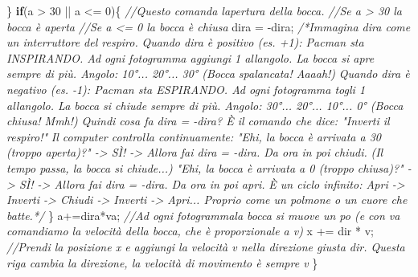 \documentclass[
]{article}
\newenvironment{Shaded}{}{}
\newcommand{\CommentTok}[1]{\textcolor[rgb]{0.38,0.63,0.69}{\textit{#1}}}
\newcommand{\ControlFlowTok}[1]{\textcolor[rgb]{0.00,0.44,0.13}{\textbf{#1}}}
\newcommand{\DecValTok}[1]{\textcolor[rgb]{0.25,0.63,0.44}{#1}}
\newcommand{\NormalTok}[1]{#1}
\newcommand{\OperatorTok}[1]{\textcolor[rgb]{0.40,0.40,0.40}{#1}}
\begin{document}
\begin{Shaded}
\begin{Highlighting}[]
    \OperatorTok{\}}
    \ControlFlowTok{if}\OperatorTok{(}\NormalTok{a }\OperatorTok{\textgreater{}} \DecValTok{30} \OperatorTok{||}\NormalTok{ a }\OperatorTok{\textless{}=} \DecValTok{0}\OperatorTok{)\{} \CommentTok{//Questo comanda l\textquotesingle{}apertura della bocca.}
    \CommentTok{//Se a \textgreater{} 30 la bocca è aperta}
    \CommentTok{//Se a \textless{}= 0 la bocca è chiusa}
\NormalTok{        dira }\OperatorTok{=} \OperatorTok{{-}}\NormalTok{dira}\OperatorTok{;}
        \CommentTok{/*Immagina dira come un interruttore del respiro.}
\CommentTok{        Quando dira è positivo (es. +1): Pacman sta INSPIRANDO. Ad ogni fotogramma aggiungi 1 all\textquotesingle{}angolo. La bocca si apre sempre di più. Angolo: 10°... 20°... 30° (Bocca spalancata! Aaaah!)}
\CommentTok{        Quando dira è negativo (es. {-}1): Pacman sta ESPIRANDO. Ad ogni fotogramma togli 1 all\textquotesingle{}angolo. La bocca si chiude sempre di più. Angolo: 30°... 20°... 10°... 0° (Bocca chiusa! Mmh!)}
\CommentTok{        Quindi cosa fa dira = {-}dira? È il comando che dice: "Inverti il respiro!"}
\CommentTok{        Il computer controlla continuamente:}
\CommentTok{        "Ehi, la bocca è arrivata a 30 (troppo aperta)?" {-}\textgreater{} SÌ! {-}\textgreater{} Allora fai dira = {-}dira. Da ora in poi chiudi.}
\CommentTok{        (Il tempo passa, la bocca si chiude...)}
\CommentTok{        "Ehi, la bocca è arrivata a 0 (troppo chiusa)?" {-}\textgreater{} SÌ! {-}\textgreater{} Allora fai dira = {-}dira. Da ora in poi apri.}
\CommentTok{        È un ciclo infinito: Apri {-}\textgreater{} Inverti {-}\textgreater{} Chiudi {-}\textgreater{} Inverti {-}\textgreater{} Apri... Proprio come un polmone o un cuore che batte.*/}
    \OperatorTok{\}}
\NormalTok{    a}\OperatorTok{+=}\NormalTok{dira}\OperatorTok{*}\NormalTok{va}\OperatorTok{;} \CommentTok{//Ad ogni fotogrammala bocca si muove un po\textquotesingle{} (e con va comandiamo la velocità della bocca, che è proporzionale a v)}
\NormalTok{    x }\OperatorTok{+=}\NormalTok{ dir }\OperatorTok{*}\NormalTok{ v}\OperatorTok{;} \CommentTok{//Prendi la posizione x e aggiungi la velocità v nella direzione giusta dir. Questa riga cambia la direzione, la velocità di movimento è sempre v}
\OperatorTok{\}}
\end{Highlighting}
\end{Shaded}
\end{document}
